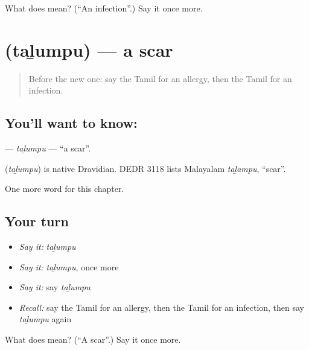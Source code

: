 \begin{tcolorbox}[breakable,colback=teal!4,colframe=teal!35!black,title={Before you move on}]
What does  mean? (\textquotedblleft{}An infection\textquotedblright{}.) Say it once more.
\end{tcolorbox}
\section[\texorpdfstring{\ta{தழும்பு} (taḻumpu)}{தழும்பு (taḻumpu)}]{ (taḻumpu) — a scar}

\label{lesson:TA-C170-talumpu}



\begin{quote}
Before the new one: say the Tamil for an allergy, then the Tamil for an infection.
\end{quote}

\subsection*{You'll want to know: }
\textbf{} — \emph{taḻumpu} — \textquotedblleft{}a scar\textquotedblright{}.

\begin{cousinweb}
\textbf{} (\emph{taḻumpu}) is native Dravidian. DEDR 3118 lists Malayalam \emph{taḻampu}, \textquotedblleft{}scar\textquotedblright{}.
\end{cousinweb}

\begin{grammarlens}[title={What you've built}]
One more word for this chapter.
\end{grammarlens}

\subsection*{Your turn}
\begin{itemize}
\raggedright
  \item \emph{Say it:} \emph{taḻumpu}
  \item \emph{Say it:} \emph{taḻumpu}, once more
  \item \emph{Say it:} say \emph{taḻumpu}
  \item \emph{Recall:} say the Tamil for an allergy, then the Tamil for an infection, then say \emph{taḻumpu} again
\end{itemize}

\begin{tcolorbox}[breakable,colback=teal!4,colframe=teal!35!black,title={Before you move on}]
What does  mean? (\textquotedblleft{}A scar\textquotedblright{}.) Say it once more.
\end{tcolorbox}
